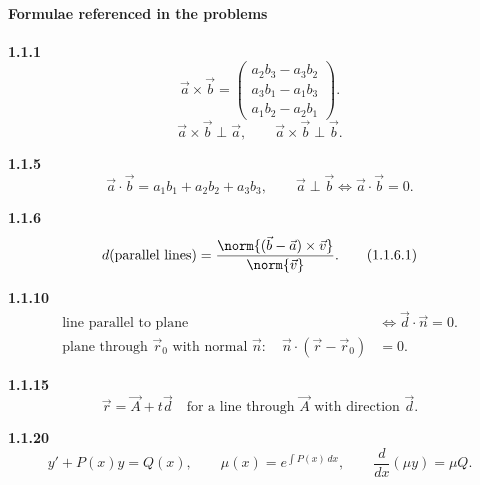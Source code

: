\paragraph*{Formulae referenced in the problems}\par
\noindent\textbf{1.1.1}\quad
\begin{equation}
\vec a\times\vec b=
\begin{pmatrix}
a_2b_3-a_3b_2\\
a_3b_1-a_1b_3\\
a_1b_2-a_2b_1
\end{pmatrix}.
\tag{1.1.1.1}\label{eq:cross-product}
\end{equation}
\begin{equation}
\vec a\times\vec b\perp\vec a,\qquad
\vec a\times\vec b\perp\vec b.
\tag{1.1.1.2}\label{eq:cross-perpendicular}
\end{equation}

\noindent\textbf{1.1.5}\quad
\begin{equation}
\vec a\cdot\vec b=a_1b_1+a_2b_2+a_3b_3,\qquad
\vec a\perp\vec b\iff\vec a\cdot\vec b=0.
\tag{1.1.5.1}\label{eq:dot-product}
\end{equation}

\noindent\textbf{1.1.6}\quad
\begin{equation}
d(\text{parallel lines})=
\frac{\norm{(\vec b-\vec a)\times\vec v}}{\norm{\vec v}}.
\tag{1.1.6.1}\label{eq:parallel-distance}
\end{equation}

\noindent\textbf{1.1.10}\quad
\begin{align}
\text{line parallel to plane}&\iff \vec d\cdot\vec n=0.
\tag{1.1.10.1}\label{eq:line-plane-parallel}\\
\text{plane through }\vec r_0\text{ with normal }\vec n:\quad
\vec n\cdot(\vec r-\vec r_0)&=0.
\tag{1.1.10.2}\label{eq:plane-normal}
\end{align}

\noindent\textbf{1.1.15}\quad
\begin{equation}
\vec r=\vec A+t\vec d
\quad\text{for a line through }\vec A\text{ with direction }\vec d.
\tag{1.1.15.1}\label{eq:line-point-direction}
\end{equation}

\noindent\textbf{1.1.20}\quad
\begin{equation}
y'+P(x)y=Q(x),\qquad
\mu(x)=e^{\int P(x)\,dx},\qquad
\frac{d}{dx}(\mu y)=\mu Q.
\tag{1.1.20.1}\label{eq:if-20}
\end{equation}

